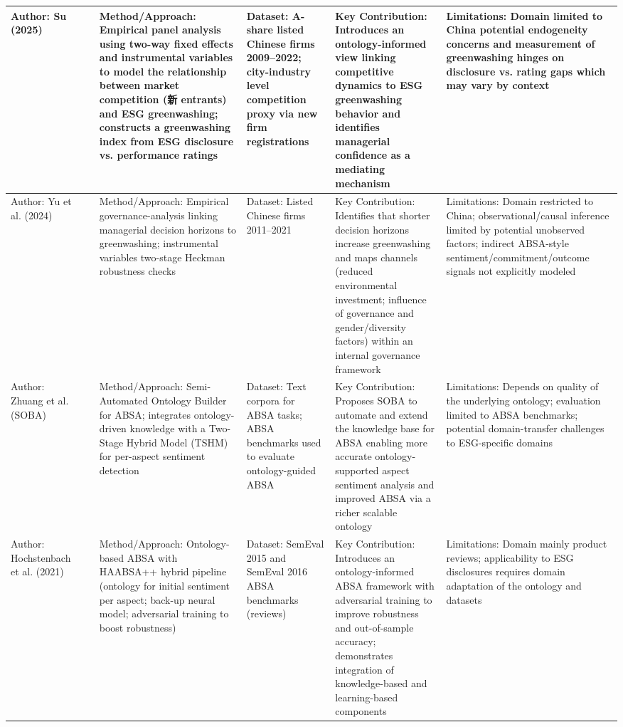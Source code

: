 \documentclass{article}
\begin{document}
\begin{landscape}
\begin{longtable}{p{1.8cm}
p{2.6cm}
p{3.4cm}
p{2.6cm}
p{3.5cm}
p{3.5cm}}
Author: Su (2025) & ~ & Method/Approach: Empirical panel analysis using two-way fixed effects and instrumental variables to model the relationship between market competition (新 entrants) and ESG greenwashing; constructs a greenwashing index from ESG disclosure vs. performance ratings & Dataset: A-share listed Chinese firms 2009–2022; city-industry level competition proxy via new firm registrations & Key Contribution: Introduces an ontology-informed view linking competitive dynamics to ESG greenwashing behavior and identifies managerial confidence as a mediating mechanism & Limitations: Domain limited to China potential endogeneity concerns and measurement of greenwashing hinges on disclosure vs. rating gaps which may vary by context \\ \hline
Author: Yu et al. (2024) & ~ & Method/Approach: Empirical governance-analysis linking managerial decision horizons to greenwashing; instrumental variables two-stage Heckman robustness checks & Dataset: Listed Chinese firms 2011–2021 & Key Contribution: Identifies that shorter decision horizons increase greenwashing and maps channels (reduced environmental investment; influence of governance and gender/diversity factors) within an internal governance framework & Limitations: Domain restricted to China; observational/causal inference limited by potential unobserved factors; indirect ABSA-style sentiment/commitment/outcome signals not explicitly modeled \\ \hline
Author: Zhuang et al. (SOBA) & ~ & Method/Approach: Semi-Automated Ontology Builder for ABSA; integrates ontology-driven knowledge with a Two-Stage Hybrid Model (TSHM) for per-aspect sentiment detection & Dataset: Text corpora for ABSA tasks; ABSA benchmarks used to evaluate ontology-guided ABSA & Key Contribution: Proposes SOBA to automate and extend the knowledge base for ABSA enabling more accurate ontology-supported aspect sentiment analysis and improved ABSA via a richer scalable ontology & Limitations: Depends on quality of the underlying ontology; evaluation limited to ABSA benchmarks; potential domain-transfer challenges to ESG-specific domains \\ \hline
Author: Hochstenbach et al. (2021) & ~ & Method/Approach: Ontology-based ABSA with HAABSA++ hybrid pipeline (ontology for initial sentiment per aspect; back-up neural model; adversarial training to boost robustness) & Dataset: SemEval 2015 and SemEval 2016 ABSA benchmarks (reviews) & Key Contribution: Introduces an ontology-informed ABSA framework with adversarial training to improve robustness and out-of-sample accuracy; demonstrates integration of knowledge-based and learning-based components & Limitations: Domain mainly product reviews; applicability to ESG disclosures requires domain adaptation of the ontology and datasets \\
\end{longtable}
\end{landscape}
\end{document}
